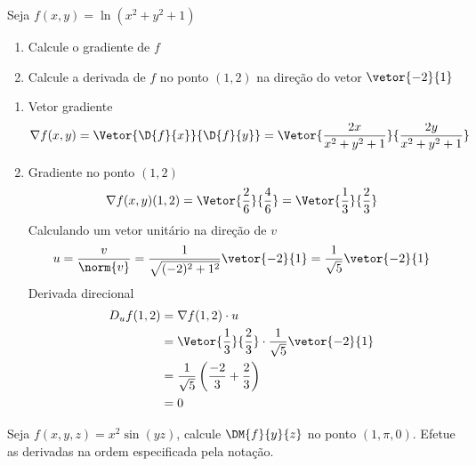 \documentclass[a4paper,12pt,fleqn]{article}
\begin{document}
Seja \( f(x, y) = \ln(x^2 + y^2 + 1) \)
\begin{enumerate}[label=\alph*)]
  \item Calcule o gradiente de $f$
  \item Calcule a derivada de $f$ no ponto $(1, 2)$ na direção do vetor $\vetor{-2}{1}$
\end{enumerate}
\clearpagequestiononly

\begin{answer}
  \begin{enumerate}[label=\alph*)]
    \item
    Vetor gradiente
    \[
    \nabla f(x, y)
    = \Vetor{\D{f}{x}}{\D{f}{y}}
    = \Vetor{\frac{2x}{x^2 + y^2 + 1}}{\frac{2y}{x^2 + y^2 + 1}}
    \]
    \item
    Gradiente no ponto $(1, 2)$
    \[
    \nabla f(x, y) (1, 2)
    = \Vetor{\frac{2}{6}}{\frac{4}{6}}
    = \Vetor{\frac{1}{3}}{\frac{2}{3}}
    \]
    Calculando um vetor unitário na direção de $v$
    \[
    u
    = \frac{v}{\norm{v}}
    = \frac{1}{\sqrt{(-2)^2 + 1^2}} \vetor{-2}{1}
    = \frac{1}{\sqrt{5}} \vetor{-2}{1}
    \]
    Derivada direcional
    \begin{align*}
      D_u f(1, 2)
      & = \nabla f(1, 2) \cdot u                       \\
      & = \Vetor{\frac{1}{3}}{\frac{2}{3}} \cdot \frac{1}{\sqrt{5}} \vetor{-2}{1} \\
      & = \frac{1}{\sqrt{5}} \left( \frac{-2}{3} + \frac{2}{3} \right) \\
      &  = 0
    \end{align*}
  \end{enumerate}
\end{answer}

Seja \( f(x, y, z) = x^2 \sin(yz) \),
calcule \( \DM{f}{y}{z} \) no ponto \( (1, \pi, 0) \).
Efetue as derivadas na ordem especificada pela notação.
\clearpagequestiononly
\end{document}
